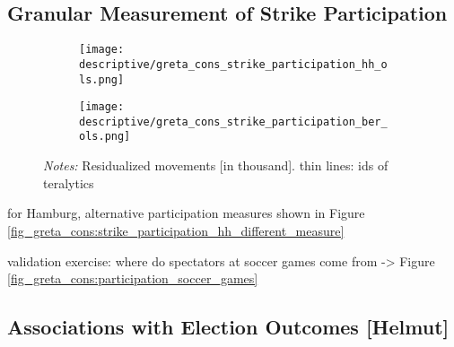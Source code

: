 \documentclass[11pt, a4paper]{article} %
\begin{document}
\subsection{Granular Measurement of Strike Participation}



\begin{figure}[H]\centering
	\caption{Strike participation for selected strikes}
	\label{fig_greta_cons:strike_participation_hh_ber}
	\begin{subfigure}[h]{0.45\linewidth}\centering
		\texttt{[image: descriptive/greta\_cons\_strike\_participation\_hh\_ols.png]}
	\end{subfigure}
	\begin{subfigure}[h]{0.45\linewidth}\centering
		\texttt{[image: descriptive/greta\_cons\_strike\_participation\_ber\_ols.png]}
	\end{subfigure}
	\begin{minipage}{0.9\linewidth}
		\scriptsize{\emph{Notes:} Residualized movements [in thousand]. thin lines: ids of teralytics}
	\end{minipage}
\end{figure}


for Hamburg, alternative participation measures shown in Figure \ref{fig_greta_cons:strike_participation_hh_different_measure}

validation exercise: where do spectators at soccer games come from -> Figure \ref{fig_greta_cons:participation_soccer_games}










\clearpage
\subsection{Associations with Election Outcomes [Helmut]}
\end{document}
